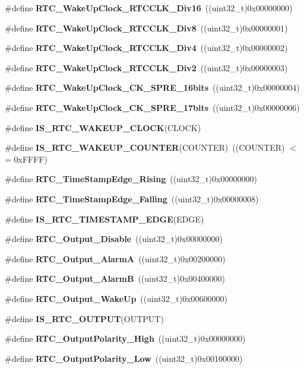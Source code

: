 \begin{DoxyCompactItemize}
\item 
\#define \textbf{ R\+T\+C\+\_\+\+Wake\+Up\+Clock\+\_\+\+R\+T\+C\+C\+L\+K\+\_\+\+Div16}~((uint32\+\_\+t)0x00000000)
\item 
\#define \textbf{ R\+T\+C\+\_\+\+Wake\+Up\+Clock\+\_\+\+R\+T\+C\+C\+L\+K\+\_\+\+Div8}~((uint32\+\_\+t)0x00000001)
\item 
\#define \textbf{ R\+T\+C\+\_\+\+Wake\+Up\+Clock\+\_\+\+R\+T\+C\+C\+L\+K\+\_\+\+Div4}~((uint32\+\_\+t)0x00000002)
\item 
\#define \textbf{ R\+T\+C\+\_\+\+Wake\+Up\+Clock\+\_\+\+R\+T\+C\+C\+L\+K\+\_\+\+Div2}~((uint32\+\_\+t)0x00000003)
\item 
\#define \textbf{ R\+T\+C\+\_\+\+Wake\+Up\+Clock\+\_\+\+C\+K\+\_\+\+S\+P\+R\+E\+\_\+16bits}~((uint32\+\_\+t)0x00000004)
\item 
\#define \textbf{ R\+T\+C\+\_\+\+Wake\+Up\+Clock\+\_\+\+C\+K\+\_\+\+S\+P\+R\+E\+\_\+17bits}~((uint32\+\_\+t)0x00000006)
\item 
\#define \textbf{ I\+S\+\_\+\+R\+T\+C\+\_\+\+W\+A\+K\+E\+U\+P\+\_\+\+C\+L\+O\+CK}(C\+L\+O\+CK)
\item 
\#define \textbf{ I\+S\+\_\+\+R\+T\+C\+\_\+\+W\+A\+K\+E\+U\+P\+\_\+\+C\+O\+U\+N\+T\+ER}(C\+O\+U\+N\+T\+ER)~((C\+O\+U\+N\+T\+ER) $<$= 0x\+F\+F\+F\+F)
\item 
\#define \textbf{ R\+T\+C\+\_\+\+Time\+Stamp\+Edge\+\_\+\+Rising}~((uint32\+\_\+t)0x00000000)
\item 
\#define \textbf{ R\+T\+C\+\_\+\+Time\+Stamp\+Edge\+\_\+\+Falling}~((uint32\+\_\+t)0x00000008)
\item 
\#define \textbf{ I\+S\+\_\+\+R\+T\+C\+\_\+\+T\+I\+M\+E\+S\+T\+A\+M\+P\+\_\+\+E\+D\+GE}(E\+D\+GE)
\item 
\#define \textbf{ R\+T\+C\+\_\+\+Output\+\_\+\+Disable}~((uint32\+\_\+t)0x00000000)
\item 
\#define \textbf{ R\+T\+C\+\_\+\+Output\+\_\+\+AlarmA}~((uint32\+\_\+t)0x00200000)
\item 
\#define \textbf{ R\+T\+C\+\_\+\+Output\+\_\+\+AlarmB}~((uint32\+\_\+t)0x00400000)
\item 
\#define \textbf{ R\+T\+C\+\_\+\+Output\+\_\+\+Wake\+Up}~((uint32\+\_\+t)0x00600000)
\item 
\#define \textbf{ I\+S\+\_\+\+R\+T\+C\+\_\+\+O\+U\+T\+P\+UT}(O\+U\+T\+P\+UT)
\item 
\#define \textbf{ R\+T\+C\+\_\+\+Output\+Polarity\+\_\+\+High}~((uint32\+\_\+t)0x00000000)
\item 
\#define \textbf{ R\+T\+C\+\_\+\+Output\+Polarity\+\_\+\+Low}~((uint32\+\_\+t)0x00100000)

\end{DoxyCompactItemize}
